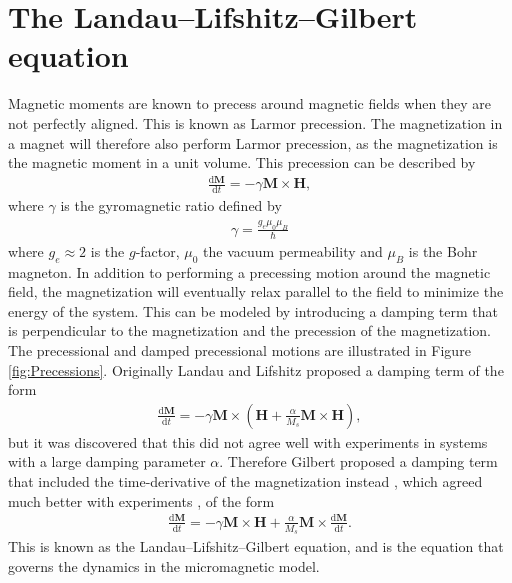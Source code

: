 \section{The Landau--Lifshitz--Gilbert equation}
Magnetic moments are known to precess around magnetic fields when they are not perfectly aligned. This is known as Larmor precession. The magnetization in a magnet will therefore also perform Larmor precession, as the magnetization is the magnetic moment in a unit volume. This precession can be described by
\begin{align}
\frac{\textrm{d}\mathbold{M}}{\textrm{d}t} = -\gamma\mathbold{M}\times\mathbold{H},
\end{align}
where $\gamma$ is the gyromagnetic ratio defined by
\begin{align}
\gamma = \frac{g_e\mu_0\mu_B}{\hbar}
\end{align}
where $g_e \approx 2$ is the $g$-factor, $\mu_0$ the vacuum permeability and $\mu_B$ is the Bohr magneton. In addition to performing a precessing motion around the magnetic field, the magnetization will eventually relax parallel to the field to minimize the energy of the system. This can be modeled by introducing a damping term that is perpendicular to the magnetization and the precession of the magnetization. The precessional and damped precessional motions are illustrated in Figure \ref{fig:Precessions}. Originally Landau and Lifshitz proposed \cite{LandauLifshitz1935} a damping term of the form
\begin{align}
\frac{\textrm{d}\mathbold{M}}{\textrm{d}t} = -\gamma\mathbold{M}\times(\mathbold{H}+\frac{\alpha}{M_s}\mathbold{M}\times\mathbold{H}),
\end{align}
but it was discovered that this did not agree well with experiments in systems with a large damping parameter $\alpha$. Therefore Gilbert proposed a damping term that included the time-derivative of the magnetization instead \cite{Gilbert2004Classics}, which agreed much better with experiments \cite{GilbertKelly1955}, of the form
\begin{align}
\label{eq:LLG}
\frac{\textrm{d}\mathbold{M}}{\textrm{d}t} = -\gamma\mathbold{M}\times\mathbold{H}+\frac{\alpha}{M_s}\mathbold{M}\times\frac{\textrm{d}\mathbold{M}}{\textrm{d}t}.
\end{align}
This is known as the Landau--Lifshitz--Gilbert equation, and is the equation that governs the dynamics in the micromagnetic model.
